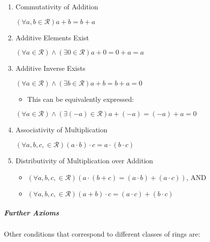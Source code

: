 \documentclass[a4paper,11pt,twoside]{article}
\begin{document}
\begin{enumerate}
\item Commutativity of Addition

\(\left( \forall a,b \in \mathcal{R}  \right) a +  b = b +  a\)

\item Additive Elements Exist

\(\left( \forall a \in \mathcal{R} \right) \wedge \left( \exists 0 \in \mathcal{R} \right) a +  0= 0 +  a =  a\)

\item Additive Inverse Exists

\(\left( \forall a \in \mathcal{R} \right)\wedge \left( \exists b \in \mathcal{R} \right) a +  b =  b +  a = 0\)

\begin{itemize}
\item This can be equivalently expressed:
\end{itemize}

\(\left( \forall a \in \mathcal{R} \right)\wedge \left( \exists \left( - a\right)\in \mathcal{R} \right) a +  \left( - a \right) = \left( - a \right) +  a = 0\)

\item Associativity of Multiplication

\(\left( \forall a,b,c, \in \mathcal{R} \right)\left( a \cdot  b \right)\cdot c = a \cdot  \left( b \cdot  c \right)\)

\item Distributivity of Multiplication over Addition

\begin{itemize}
\item \(\left( \forall a,b,c, \in \mathcal{R} \right) \left( a\cdot  \left( b+ c \right)=  \left( a \cdot   b  \right) +  \left( a \cdot   c  \right) \right)\), AND
\item \(\left( \forall a,b,c, \in \mathcal{R} \right)\left( a +  b \right)\cdot   c = \left( a \cdot   c  \right)+  \left( b \cdot   c \right)\)
\end{itemize}
\end{enumerate}
\subparagraph{Further Axioms}
\label{sec:org89d7bf3}

Other conditions that correspond to different classes of rings are:
\end{document}
